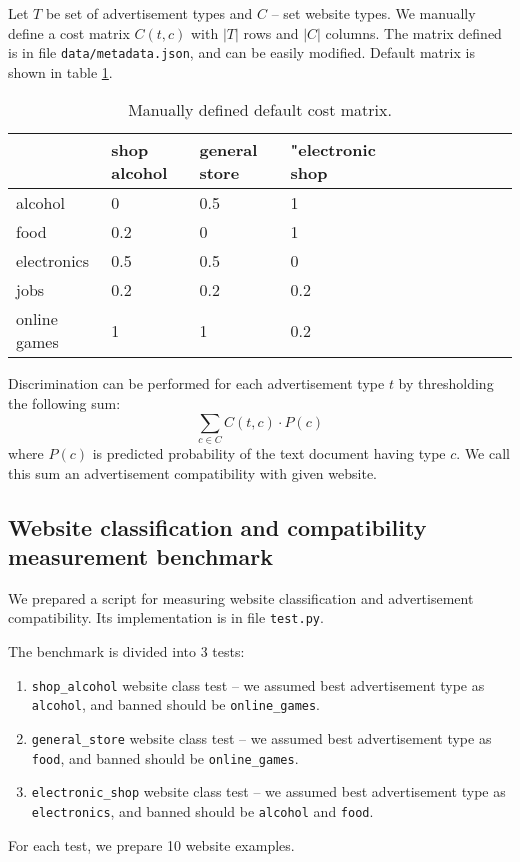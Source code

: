 \documentclass[a4paper]{article}
\begin{document}
Let $T$ be set of advertisement types and $C$ -- set website types.
We manually define a cost matrix $C(t, c)$ 
with $|T|$ rows and $|C|$ columns.
The matrix defined is in file \texttt{data/metadata.json},
and can be easily modified. Default matrix is shown in table \ref{table:costmx}.

\begin{table}[!hbt]
    \caption{Manually defined default cost matrix.
    \label{table:costmx}
    }
\footnotesize
\begin{center}
    \begin{tabular}{|l|l|l|l|l|l|l|l|l|l|l|}
    \hline
        & shop alcohol & general store  & "electronic shop \\
    \hline
          alcohol & 0& 0.5&   1 \\
    \hline
        food & 0.2&   0&   1 \\
    \hline
        electronics & 0.5& 0.5&   0 \\
    \hline
        jobs & 0.2& 0.2& 0.2 \\
    \hline
          online games & 1&   1& 0.2 \\
    \hline
    \end{tabular}
\end{center}
\end{table}

Discrimination can be performed for each advertisement type $t$
by thresholding the following sum:
\begin{equation}
    \sum_{c\in{C}} {C(t, c) \cdot P(c)}
\end{equation}
where $P(c)$ is predicted probability of the text document having type $c$.
We call this sum an advertisement compatibility with given website.



\subsection{Website classification and compatibility measurement benchmark}

We prepared a script for measuring website classification and
advertisement compatibility.
Its implementation is in file \texttt{test.py}.

The benchmark is divided into 3 tests:
\begin{enumerate}
    \item \texttt{shop\_alcohol} website class test --
        we assumed best advertisement type as \texttt{alcohol},
        and banned should be \texttt{online\_games}.
    \item \texttt{general\_store} website class test --
        we assumed best advertisement type as \texttt{food},
        and banned should be \texttt{online\_games}.
    \item \texttt{electronic\_shop} website class test --
        we assumed best advertisement type as \texttt{electronics},
        and banned should be \texttt{alcohol} and \texttt{food}.
\end{enumerate}
For each test, we prepare 10 website examples.
\end{document}
